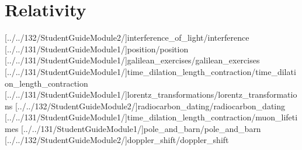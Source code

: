 \documentclass[english,twoside]{article}
\begin{document}


\setcounter{tocdepth}{1}\tableofcontents{}
\cleardoublepage

\part{Relativity}

[../../132/StudentGuideModule2/]{interference_of_light/interference} %
[../../131/StudentGuideModule1/]{position/position}
[../../131/StudentGuideModule1/]{galilean_exercises/galilean_exercises}
[../../131/StudentGuideModule1/]{time_dilation_length_contraction/time_dilation_length_contraction} 
[../../131/StudentGuideModule1/]{lorentz_transformations/lorentz_transformations}
[../../132/StudentGuideModule2/]{radiocarbon_dating/radiocarbon_dating}
[../../131/StudentGuideModule1/]{time_dilation_length_contraction/muon_lifetimes}
[../../131/StudentGuideModule1/]{pole_and_barn/pole_and_barn} 
[../../132/StudentGuideModule2/]{doppler_shift/doppler_shift}


\startappendix
{}

\startinstructornotes
\end{document}
